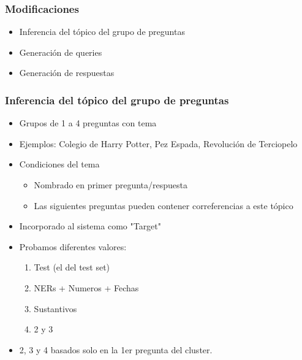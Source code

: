 \begin{frame}
\frametitle{Modificaciones}
  \begin{itemize}
    \item Inferencia del tópico del grupo de preguntas
    \item Generación de queries
    \item Generación de respuestas
  \end{itemize}
\end{frame}

\begin{frame}
\frametitle{Inferencia del tópico del grupo de preguntas}
  \begin{itemize}
    \item Grupos de 1 a 4 preguntas con tema
    \item Ejemplos: Colegio de Harry Potter, Pez Espada, Revolución de Terciopelo
    \item Condiciones del tema
    \begin{itemize}
      \item Nombrado en primer pregunta/respuesta
      \item Las siguientes preguntas pueden contener correferencias a este tópico
    \end{itemize}
    \item Incorporado al sistema como "Target"
    \item Probamos diferentes valores:
    \begin{enumerate}
      \item Test (el del test set)
      \item NERs + Numeros + Fechas
      \item Sustantivos
      \item 2 y 3
    \end{enumerate}
    \item 2, 3 y 4 basados solo en la 1er pregunta del cluster.
  \end{itemize}
\end{frame}

